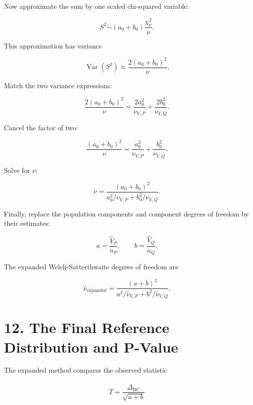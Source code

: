\documentclass[
  11pt]{article}
\let\originalsection\section
\renewcommand{\section}{\clearpage\originalsection}
\begin{document}
Now approximate the sum by one scaled chi-squared variable:

\begin{equation}
S^2
\mathrel{\dot\sim}
(a_0+b_0)\frac{\chi^2_{\nu}}{\nu}.
\end{equation}

This approximation has variance

\begin{equation}
\operatorname{Var}(S^2)
\approx\frac{2(a_0+b_0)^2}{\nu}.
\end{equation}

Match the two variance expressions:

\begin{equation}
\frac{2(a_0+b_0)^2}{\nu}
=
\frac{2a_0^2}{\nu_{V,P}}
+\frac{2b_0^2}{\nu_{V,Q}}.
\end{equation}

Cancel the factor of two:

\begin{equation}
\frac{(a_0+b_0)^2}{\nu}
=
\frac{a_0^2}{\nu_{V,P}}
+\frac{b_0^2}{\nu_{V,Q}}.
\end{equation}

Solve for \(\nu\):

\begin{equation}
\nu
=\frac{(a_0+b_0)^2}
{a_0^2/\nu_{V,P}+b_0^2/\nu_{V,Q}}.
\end{equation}

Finally, replace the population components and component degrees of
freedom by their estimates:

\begin{equation}
a=\frac{\widehat V_P}{n_P},
\qquad
b=\frac{\widehat V_Q}{n_Q}.
\end{equation}

The expanded Welch-Satterthwaite degrees of freedom are

\begin{equation}
\boxed{
\widehat\nu_{\mathrm{expanded}}
=\frac{(a+b)^2}
{a^2/\widehat\nu_{V,P}
+b^2/\widehat\nu_{V,Q}}.
}
\end{equation}

\section{12. The Final Reference Distribution and
P-Value}\label{the-final-reference-distribution-and-p-value}

The expanded method compares the observed statistic

\begin{equation}
T
=\frac{\widehat\Delta_{\mathrm{BC}}}{\sqrt{a+b}}
\end{equation}
\end{document}
